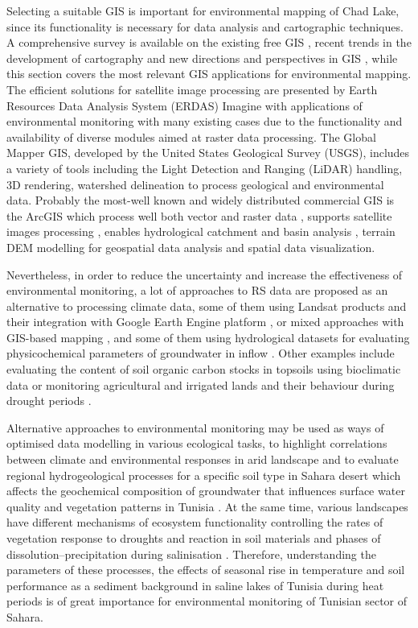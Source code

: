 \documentclass[environments,article,submit,pdftex,moreauthors]{Definitions/mdpi}
\begin{document}
Selecting a suitable GIS is important for environmental mapping of Chad Lake, since its functionality is necessary for data analysis and cartographic techniques. A comprehensive survey is available on the existing free GIS \cite{LEIDIG201549,CHEN2010253}, recent trends in the development of cartography \cite{WangWu} and new directions and perspectives in GIS \cite{Lietal2022}, while this section covers the most relevant GIS applications for environmental mapping. The efficient solutions for satellite image processing are presented by Earth Resources Data Analysis System (ERDAS) Imagine with applications of environmental monitoring \cite{FALAKI2020363} with many existing cases due to the functionality and availability of diverse modules aimed at raster data processing. The Global Mapper GIS, developed by the United States Geological Survey (USGS), includes a variety of tools including the Light Detection and Ranging (LiDAR) handling, 3D rendering, watershed delineation to process geological and environmental data. Probably the most-well known and widely distributed commercial GIS is the ArcGIS which process well both vector and raster data \cite{AlDjazouli}, supports satellite images processing \cite{SESNIE20082145}, enables hydrological catchment and basin analysis \cite{Nkiaka}, terrain DEM modelling for geospatial data analysis \cite{Kay} and spatial data visualization. 

Nevertheless, in order to reduce the uncertainty and increase the effectiveness of environmental monitoring, a lot of approaches to RS data are proposed as an alternative to processing climate data, some of them using Landsat products \cite{Lemenkova202315} and their integration with Google Earth Engine platform \cite{rs15133257}, or mixed approaches with GIS-based mapping \cite{SAIDI20091683,ANANE201236,Lemenkova202217}, and some of them using hydrological datasets for evaluating physicochemical parameters of groundwater in inflow \cite{BENBRAHIM2021104224}. Other examples include evaluating the content of soil organic carbon stocks in topsoils using bioclimatic data \cite{BAHRI2022e00561} or monitoring agricultural and irrigated lands and their behaviour during drought periods \cite{MOHAMED2023e01766}. 

Alternative approaches to environmental monitoring may be used as ways of optimised data modelling in various ecological tasks, to highlight correlations between climate and environmental responses in arid landscape \cite{BESSER2021104134} and to evaluate regional hydrogeological processes for a specific soil type in Sahara desert which affects the geochemical composition of groundwater that influences surface water quality and vegetation patterns in Tunisia \cite{HAMDI2021102974,RAFAATRIGUI2021104121}. At the same time, various landscapes have different mechanisms of ecosystem functionality controlling the rates of vegetation response to droughts and reaction in soil materials and phases of dissolution–precipitation during salinisation \cite{NAVARROTORRE2023105397}. Therefore, understanding the parameters of these processes, the effects of seasonal rise in temperature and soil performance as a sediment background in saline lakes of Tunisia during heat periods is of great importance for environmental monitoring of Tunisian sector of Sahara.
\end{document}

